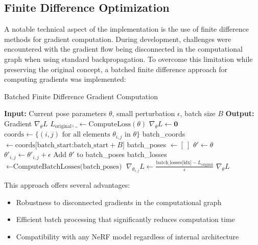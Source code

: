 \subsection{Finite Difference Optimization}

A notable technical aspect of the implementation is the use of finite difference methods for gradient computation. During development, challenges were encountered with the gradient flow being disconnected in the computational graph when using standard backpropagation. To overcome this limitation while preserving the original concept, a batched finite difference approach for computing gradients was implemented:

\begin{algorithm}[H]
\caption{Batched Finite Difference Gradient Computation}
\begin{algorithmic}[1]
\State \textbf{Input:} Current pose parameters $\theta$, small perturbation $\epsilon$, batch size $B$
\State \textbf{Output:} Gradient $\nabla_{\theta} L$
\State $L_{\text{original}}, \_ \gets \text{ComputeLoss}(\theta)$ 
\State $\nabla_{\theta} L \gets \mathbf{0}$ 
\State $\text{coords} \gets \{(i,j) \text{ for all elements } \theta_{i,j} \text{ in } \theta\}$ 
    \State batch\_coords $\gets \text{coords[batch\_start:batch\_start}+B]$
    \State batch\_poses $\gets [\:]$ 
        \State $\theta' \gets \theta$
        \State $\theta'_{i,j} \gets \theta'_{i,j} + \epsilon$ 
        \State Add $\theta'$ to batch\_poses
    \EndFor
    \State batch\_losses $\gets \text{ComputeBatchLosses(batch\_poses)}$
        \State $\nabla_{\theta_{i,j}} L \gets \frac{\text{batch\_losses[idx]} - L_{\text{original}}}{\epsilon}$ 
    \EndFor
\EndFor
\State \Return $\nabla_{\theta} L$
\end{algorithmic}
\end{algorithm}

This approach offers several advantages:
\begin{itemize}
    \item Robustness to disconnected gradients in the computational graph
    \item Efficient batch processing that significantly reduces computation time
    \item Compatibility with any NeRF model regardless of internal architecture
\end{itemize}

